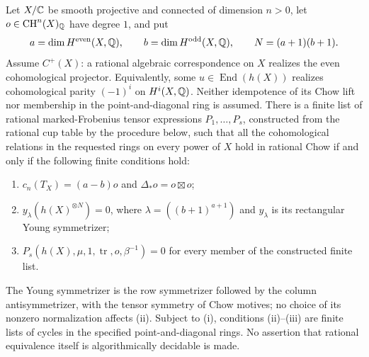 \begin{theorem}
\label{c:finite-super-criterion}
Let $X/\mathbb C$ be smooth projective and connected of dimension $n>0$,
let $o\in\operatorname{CH}^n(X)_\mathbb Q$ have degree $1$, and put
\[
 a=\dim H^{\rm even}(X,\mathbb Q),\qquad
 b=\dim H^{\rm odd}(X,\mathbb Q),\qquad
 N=(a+1)(b+1).
\]
Assume $C^+(X)$: a rational algebraic correspondence on $X$ realizes
the even cohomological projector.  Equivalently, some
$u\in\operatorname{End}(h(X))$ realizes cohomological parity
$(-1)^i$ on $H^i(X,\mathbb Q)$.  Neither idempotence of its Chow lift nor
membership in the point-and-diagonal ring is assumed.
There is a finite list of rational marked-Frobenius tensor
expressions $P_1,\ldots,P_s$, constructed from the rational cup
table by the procedure below, such that all the cohomological
relations in the requested rings on every power of $X$ hold in
rational Chow if and only if the following finite conditions hold:
\begin{enumerate}[label=(\roman*)]
\item $c_n(T_X)=(a-b)o$ and $\Delta_*o=o\boxtimes o$;
\item $y_\lambda(h(X)^{\otimes N})=0$, where
      $\lambda=((b+1)^{a+1})$ and $y_\lambda$ is its rectangular
      Young symmetrizer;
\item $P_s(h(X),\mu,1,\operatorname{tr},o,\beta^{-1})=0$ for
      every member of the constructed finite list.
\end{enumerate}
The Young symmetrizer is the row symmetrizer followed by the column
antisymmetrizer, with the tensor symmetry of Chow motives; no
choice of its nonzero normalization affects (ii).
Subject to (i), conditions (ii)--(iii) are finite lists of cycles
in the specified point-and-diagonal rings.  No assertion that
rational equivalence itself is algorithmically decidable is made.
\end{theorem}

